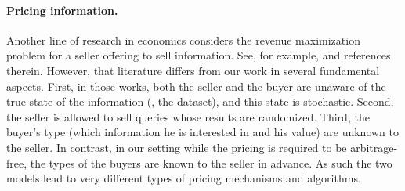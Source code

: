 \paragraph{Pricing information.}
Another line of research in economics considers the revenue maximization problem for a seller offering to sell information. See, for example, \cite{BKP-12, BB-15, BBS-17} and references therein. However, that literature differs from our work in several fundamental aspects. First, in those works, both the seller and the buyer are unaware of the true state of the information (\ie, the dataset), and this state is stochastic. Second, the seller is allowed to sell queries whose results are randomized. Third, the buyer's type (which information he is interested in and his value) are unknown to the seller. In contrast, in our setting while the pricing is required to be arbitrage-free, the types of the buyers are known to the seller in advance. As such the two models lead to very different types of pricing mechanisms and algorithms.